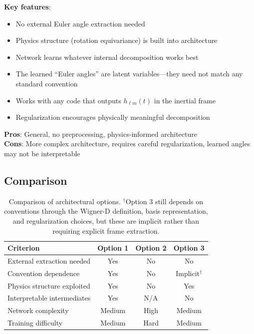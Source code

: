 \documentclass[11pt,a4paper]{article}
\newcommand{\hlm}{h_{\ell m}}
\begin{document}
\textbf{Key features}:
\begin{itemize}
    \item No external Euler angle extraction needed
    \item Physics structure (rotation equivariance) is built into architecture
    \item Network learns whatever internal decomposition works best
    \item The learned ``Euler angles'' are latent variables---they need not match any standard convention
    \item Works with any code that outputs $\hlm(t)$ in the inertial frame
    \item Regularization encourages physically meaningful decomposition
\end{itemize}

\textbf{Pros}: General, no preprocessing, physics-informed architecture \\
\textbf{Cons}: More complex architecture, requires careful regularization, learned angles may not be interpretable

\subsection{Comparison}

\begin{table}[h]
\centering
\begin{tabular}{lccc}
\toprule
\textbf{Criterion} & \textbf{Option 1} & \textbf{Option 2} & \textbf{Option 3} \\
\midrule
External extraction needed & Yes & No & No \\
Convention dependence & Yes & No & Implicit$^\dagger$ \\
Physics structure exploited & Yes & No & Yes \\
Interpretable intermediates & Yes & N/A & No \\
Network complexity & Medium & High & Medium \\
Training difficulty & Medium & Hard & Medium \\
\bottomrule
\end{tabular}
\caption{Comparison of architectural options. $^\dagger$Option 3 still depends on conventions through the Wigner-D definition, basis representation, and regularization choices, but these are implicit rather than requiring explicit frame extraction.}
\label{tab:options}
\end{table}

\end{document}
